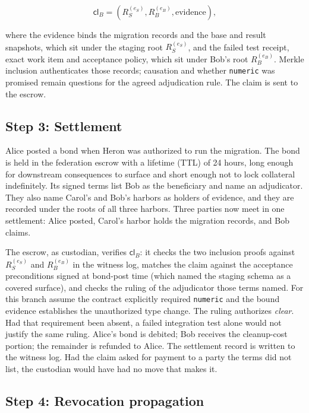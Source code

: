 \documentclass[11pt,a4paper]{article}
\theoremstyle{definition}
\theoremstyle{remark}
\begin{document}
\[
\mathsf{cl}_B = (R_S^{(e_S)}, R_B^{(e_B)}, \mathrm{evidence}),
\]

where the evidence binds the migration records and the base and result
snapshots, which sit under the staging root $R_S^{(e_S)}$, and the failed test
receipt, exact work item and acceptance policy, which sit under Bob's root
$R_B^{(e_B)}$. Merkle inclusion authenticates those records; causation and whether \texttt{numeric} was promised remain
questions for the agreed adjudication rule. The claim is sent to the escrow.

\subsection{Step 3: Settlement}\label{sec:fh-ex-settle}

Alice posted a bond when Heron was authorized to run the migration. The bond is held in the federation escrow with a lifetime (TTL) of 24 hours, long enough for downstream consequences to surface and short enough not to lock collateral indefinitely. Its signed terms list Bob as the beneficiary and name an adjudicator. They also name Carol's and Bob's harbors as holders of evidence, and they are recorded under the roots of all three harbors. Three parties now meet in one settlement: Alice posted, Carol's harbor holds the migration records, and Bob claims.

The escrow, as custodian, verifies $\mathsf{cl}_B$: it checks the two inclusion proofs against $R_S^{(e_S)}$ and $R_B^{(e_B)}$ in the witness log, matches the claim against the acceptance preconditions signed at bond-post time (which named the staging schema as a covered surface), and checks the ruling of the adjudicator those terms named. For this branch assume the
contract explicitly required \texttt{numeric} and the bound evidence
establishes the unauthorized type change. The ruling authorizes \emph{clear}.
Had that requirement been absent, a failed integration test alone would not
justify the same ruling. Alice's bond is debited; Bob receives the cleanup-cost portion; the remainder is refunded to Alice. The settlement record is written to the witness log. Had the claim asked for payment to a party the terms did not list, the custodian would have had no move that makes it.

\subsection{Step 4: Revocation propagation}\label{sec:fh-ex-revocation}
\end{document}

